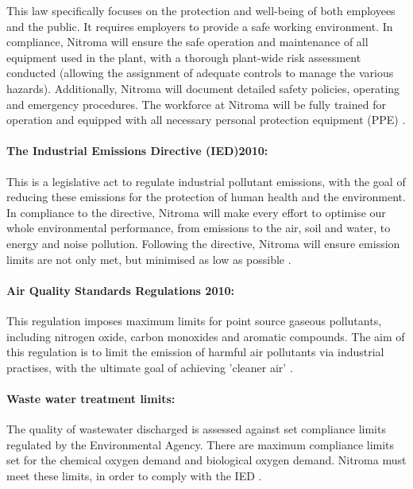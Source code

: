 This law specifically focuses on the protection and well-being of both employees and the public. It requires employers to provide a safe working environment. In compliance, Nitroma will ensure the safe operation and maintenance of all equipment used in the plant, with a thorough plant-wide risk assessment conducted (allowing the assignment of adequate controls to manage the various hazards). Additionally, Nitroma will document detailed safety policies, operating and emergency procedures. The workforce at Nitroma will be fully trained for operation and equipped with all necessary personal protection equipment (PPE) \cite{british_safety_council_health_nodate}.

\paragraph{The Industrial Emissions Directive (IED)2010:}

This is a legislative act to regulate industrial pollutant emissions, with the goal of reducing these emissions for the protection of human health and the environment. In compliance to the directive, Nitroma will make every effort to optimise our whole environmental performance, from emissions to the air, soil and water, to energy and noise pollution. Following the directive, Nitroma will ensure emission limits are not only met, but minimised as low as possible \cite{european_commission_industrial_nodate}. 

\paragraph{Air Quality Standards Regulations 2010:}

This regulation imposes maximum limits for point source gaseous pollutants, including nitrogen oxide, carbon monoxides and aromatic compounds. The aim of this regulation is to limit the emission of harmful air pollutants via industrial practises, with the ultimate goal of achieving 'cleaner air' \cite{tilling_meeting_2017}.  

\paragraph{Waste water treatment limits:}

The quality of wastewater discharged is assessed against set compliance limits regulated by the Environmental Agency. There are maximum compliance limits set for the chemical oxygen demand and biological oxygen demand. Nitroma must meet these limits, in order to comply with the IED \cite{environment_agency_waste_nodate}. 

